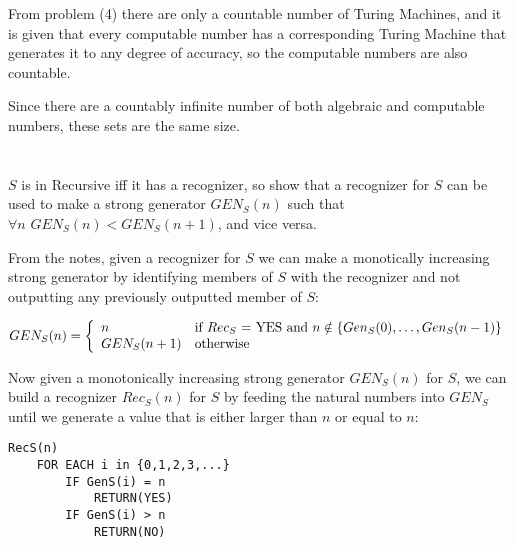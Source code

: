 \documentclass{article}
\begin{document}
From problem (4) there are only a countable number of Turing Machines, and it is
given that every computable number has a corresponding Turing Machine that
generates it to any degree of accuracy, so the computable numbers are also
countable.

\vspace{1em}

Since there are a countably infinite number of both algebraic and computable
numbers, these sets are the same size.

\section{}

$S$ is in Recursive iff it has a recognizer, so show that a recognizer for $S$
can be used to make a strong generator $GEN_S(n)$ such that
$\forall n \hspace{4pt} GEN_S(n) < GEN_S(n + 1)$, and vice versa.

\vspace{1em}

From the notes, given a recognizer for $S$ we can make a monotically increasing
strong generator by identifying members of $S$ with the recognizer and not
outputting any previously outputted member of $S$:

\[
GEN_S(n) = \left\{
    \begin{array}{l l}
        n &  \text{if $Rec_S$ = YES and $n \notin \{Gen_S(0),\ldots,Gen_S(n-1)$\}} \\
        GEN_S(n+1) & \text{otherwise} \\
    \end{array} \right.
\]

Now given a monotonically increasing strong generator $GEN_S(n)$ for $S$, we can
build a recognizer $Rec_S(n)$ for $S$ by feeding the natural numbers into 
$GEN_S$ until we generate a value that is either larger than $n$ or equal to
$n$:

\begin{verbatim}
RecS(n)
    FOR EACH i in {0,1,2,3,...}
        IF GenS(i) = n
            RETURN(YES)
        IF GenS(i) > n
            RETURN(NO)
\end{verbatim}
\end{document}
